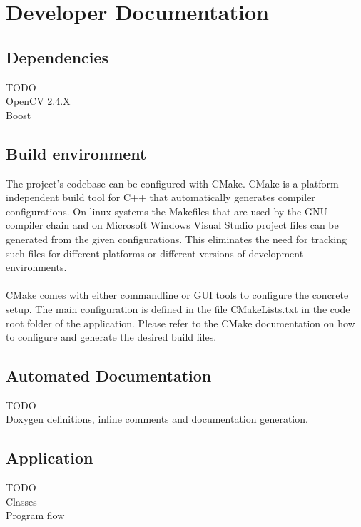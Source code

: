 \section{Developer Documentation}\label{sec:devdoc}

\subsection{Dependencies}

TODO
\\
OpenCV 2.4.X
\\
Boost

\subsection{Build environment}

The project’s codebase can be configured with CMake. CMake is a platform independent build
tool for C++ that automatically generates compiler configurations. On linux systems the Makefiles that are used by the GNU compiler chain and on Microsoft Windows Visual Studio project files can be generated from the given configurations. This eliminates the need for tracking such files for different platforms or different versions of development environments.
\\
\\
CMake comes with either commandline or GUI tools to configure the concrete setup. The main configuration is defined in the file CMakeLists.txt in the code root folder of the application. Please refer to the CMake documentation on how to configure and generate the desired build files.

\subsection{Automated Documentation}

TODO
\\
Doxygen definitions, inline comments and documentation generation.

\subsection{Application}

TODO
\\
Classes
\\
Program flow